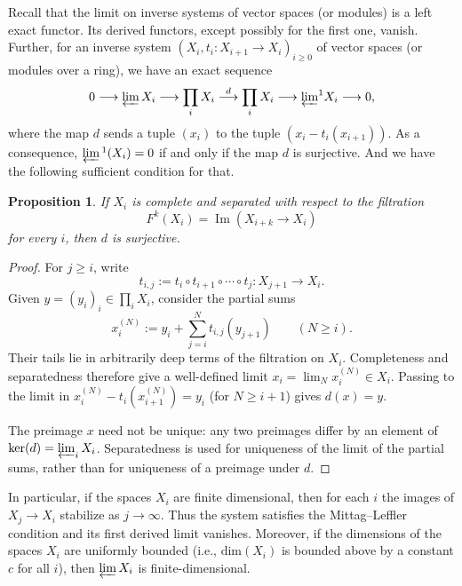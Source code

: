\documentclass[12pt,a4]{amsart}
\newtheorem{prop}[claim]{Proposition}
\theoremstyle{definition}
\begin{document}
\subsubsection{} \label{varprojlim1}
Recall that the limit on inverse systems of vector spaces 
(or modules) is a left exact functor. Its derived functors, except
possibly for the first one, vanish. Further, for an inverse system 
$(X_i,t_i: X_{i+1}\longrightarrow X_i)_{i\geq 0}$
of vector spaces (or modules over a ring), we have an exact sequence
$$0\longrightarrow \varprojlim X_i\longrightarrow\prod_iX_i
\stackrel d\longrightarrow \prod_iX_i\longrightarrow 
{\varprojlim}^1X_i\longrightarrow 0,$$
where the map $d$ sends a tuple $(x_i)$ to the tuple $(x_i-t_i(x_{i+1}))$.
As a consequence, $\varprojlim{}^1(X_i) = 0$ if and only if the map $d$ is surjective. And we have the following sufficient condition for that.
\begin{prop} 
If $X_i$ is complete and separated with respect to the filtration
\[
F^k(X_i)=\operatorname{Im}(X_{i+k}\longrightarrow X_i)
\]
for every $i$, then $d$ is surjective.
\end{prop}
\begin{proof}
For $j\geq i$, write
\[
t_{i,j}:=t_i\circ t_{i+1}\circ\cdots\circ t_j:X_{j+1}\longrightarrow X_i.
\]
Given $y=(y_i)_i\in\prod_iX_i$, consider the partial sums
\[
x_i^{(N)}:=y_i+\sum_{j=i}^{N}t_{i,j}(y_{j+1})\qquad(N\geq i).
\]
Their tails lie in arbitrarily deep terms of the filtration on $X_i$.
Completeness and separatedness therefore give a well-defined limit
$x_i=\lim_Nx_i^{(N)}\in X_i$. Passing to the limit in
$x_i^{(N)}-t_i(x_{i+1}^{(N)})=y_i$ (for $N\geq i+1$) gives $d(x)=y$.

The preimage $x$ need not be unique: any two preimages differ by an element
of $\ker(d)=\varprojlim_iX_i$. Separatedness is used for uniqueness of the
limit of the partial sums, rather than for uniqueness of a preimage under $d$.
\end{proof}
In particular, if the spaces $X_i$ are finite dimensional, then for each $i$
the images of $X_j\to X_i$ stabilize as $j\to\infty$. Thus the system satisfies
the Mittag--Leffler condition and its first derived limit vanishes. Moreover,
if the dimensions of the spaces $X_i$ are uniformly bounded (i.e.,
$\mathrm{dim}(X_i)$ is bounded above by a constant $c$ for all $i$), then
$\varprojlim X_i$ is finite-dimensional.
\end{document}

